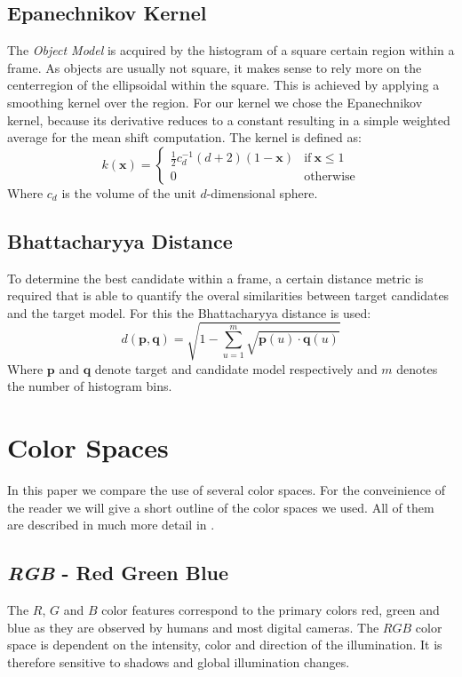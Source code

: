 \documentclass[11pt]{article}
\begin{document}
\subsection{Epanechnikov Kernel}
The \emph{Object Model} is acquired by the histogram of a square certain region
within a frame. As objects are usually not square, it makes sense to rely more
on the centerregion of the ellipsoidal within the square. This is achieved by
applying a smoothing kernel over the region. For our kernel we chose the
Epanechnikov kernel, because its derivative reduces to a constant resulting in
a simple weighted average for the mean shift computation. The kernel is defined
as:
\begin{equation}
k(\mathbf{x}) = \left\{
\begin{array}{ll}
\frac{1}{2}c^{-1}_d(d+2)(1-\mathbf{x}) & \textrm{if}~\mathbf{x} \leq 1 \\
0 & \textrm{otherwise}
\end{array}
\right.
\end{equation}
Where $c_d$ is the volume of the unit $d$-dimensional sphere.

\subsection{Bhattacharyya Distance}
To determine the best candidate within a frame, a certain distance metric is
required that is able to quantify the overal similarities between target
candidates and the target model. For this the Bhattacharyya distance is used:
\begin{equation}
d(\mathbf{p},\mathbf{q}) = \sqrt{1 - \sum^m_{u=1} \sqrt{\mathbf{p}(u) \cdot \mathbf{q}(u)}}
\end{equation}
Where $\mathbf{p}$ and $\mathbf{q}$ denote target and candidate model respectively and $m$
denotes the number of histogram bins.

\section{Color Spaces} \label{sec:color}
In this paper we compare the use of several color spaces. For the conveinience
of the reader we will give a short outline of the color spaces we used. All of
them are described in much more detail in \cite{Gevers}.

\subsection{\textit{RGB} - Red Green Blue}
The $R$, $G$ and $B$  color features correspond to the primary colors red,
green and blue as they are observed by humans and most digital cameras. The
$RGB$ color space is dependent on the intensity, color and direction of the
illumination. It is therefore sensitive to shadows and global illumination
changes.
\end{document}
